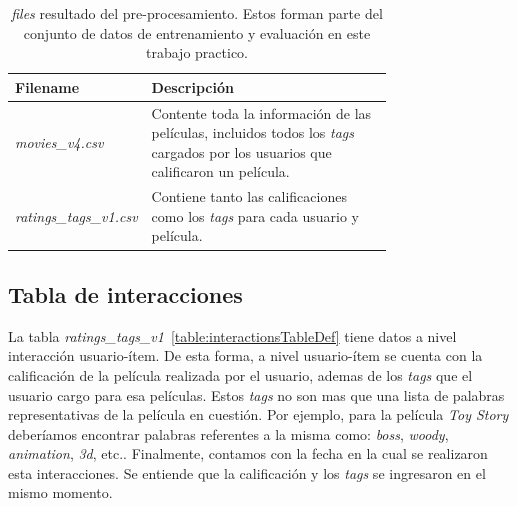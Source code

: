 \documentclass[11pt,a4paper,twoside]{thesis}
\begin{document}
\begin{table}[!htb]
	\centering
	\footnotesize
	\begin{tabular}{l | p{0.75\linewidth}}
		\hline
		Filename                       & Descripción                                                                                                                             \\
		\hline
		\textit{movies\_v4.csv}        & Contente toda la información de las películas, incluidos todos los \textit{tags} cargados por los usuarios que calificaron un película. \\
		\textit{ratings\_tags\_v1.csv} & Contiene tanto las calificaciones como los \textit{tags} para cada usuario y película.                                                  \\
		\hline
	\end{tabular}
	\caption{
		\textit{files} resultado del pre-procesamiento. Estos forman parte del conjunto de datos de entrenamiento y evaluación en este trabajo practico.
	}
	\label{table:tableFiles}
\end{table}

\subsection{Tabla de interacciones}

La tabla \textit{ratings\_tags\_v1}~\ref{table:interactionsTableDef} tiene
datos a nivel interacción usuario-ítem. De esta forma, a nivel usuario-ítem se
cuenta con la calificación de la película realizada por el usuario, ademas de
los \textit{tags} que el usuario cargo para esa películas. Estos \textit{tags}
no son mas que una lista de palabras representativas de la película en
cuestión. Por ejemplo, para la película \textit{Toy Story} deberíamos encontrar
palabras referentes a la misma como: \textit{boss}, \textit{woody}, \textit{animation},
\textit{3d}, etc.. Finalmente, contamos con la fecha en la cual se realizaron
esta interacciones. Se entiende que la calificación y los \textit{tags} se
ingresaron en el mismo momento.
\end{document}
